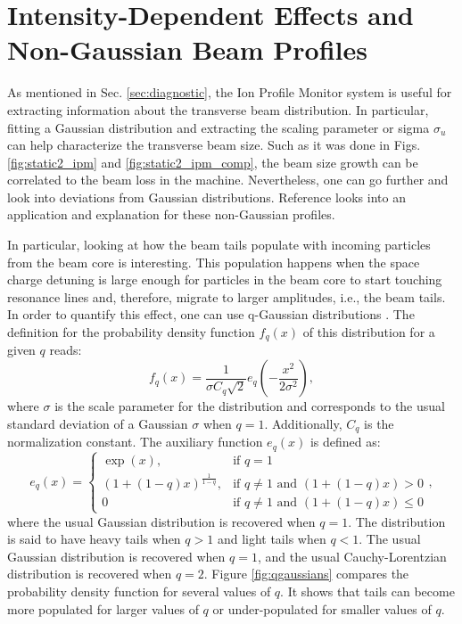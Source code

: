 \section{\label{sec:qgaussian}Intensity-Dependent Effects and Non-Gaussian Beam Profiles}

As mentioned in Sec. \ref{sec:diagnostic}, the Ion Profile Monitor system is useful for extracting information about the transverse beam distribution. In particular, fitting a Gaussian distribution and extracting the scaling parameter or sigma $\sigma_u$ can help characterize the transverse beam size. Such as it was done in Figs. \ref{fig:static2_ipm} and \ref{fig:static2_ipm_comp}, the beam size growth can be correlated to the beam loss in the machine. Nevertheless, one can go further and look into deviations from Gaussian distributions. Reference \cite{nongaussian} looks into an application and explanation for these non-Gaussian profiles.

In particular, looking at how the beam tails populate with incoming particles from the beam core is interesting. This population happens when the space charge detuning is large enough for particles in the beam core to start touching resonance lines and, therefore, migrate to larger amplitudes, i.e., the beam tails. In order to quantify this effect, one can use q-Gaussian distributions \cite{nongaussian,qgaussian}. The definition for the probability density function $f_q(x)$ of this distribution for a given $q$ reads:
\begin{equation}
    \label{eq:qgaussian}
    f_q(x)=\frac{1}{\sigma C_q \sqrt{2}}e_q\left( -\frac{x^2}{2 \sigma^2}\right),
\end{equation}
where $\sigma$ is the scale parameter for the distribution and corresponds to the usual standard deviation of a Gaussian $\sigma$ when $q=1$. Additionally, $C_q$ is the normalization constant. The auxiliary function $e_q(x)$ is defined as:
\begin{equation}
    \label{eq:eqqGaussian}
    e_q(x)= \left\{
        \begin{array}{cl} 
            \exp{(x)}, & \text{if  } q = 1\\
            \left( 1+\left( 1-q \right)x\right)^{\frac{1}{1-q}}, & \text{if  } q \neq 1 \text{ and } \left( 1+\left( 1-q\right)x\right)>0\\
            0  & \text{if  } q \neq 1 \text{ and } \left( 1+\left( 1-q\right)x\right) \leq 0 
        \end{array} 
    \right.,
\end{equation}
where the usual Gaussian distribution is recovered when $q=1$. The distribution is said to have heavy tails when $q>1$ and light tails when $q<1$. The usual Gaussian distribution is recovered when $q=1$, and the usual Cauchy-Lorentzian distribution is recovered when $q=2$. Figure \ref{fig:qgaussians} compares the probability density function for several values of $q$. It shows that tails can become more populated for larger values of $q$ or under-populated for smaller values of $q$.  

